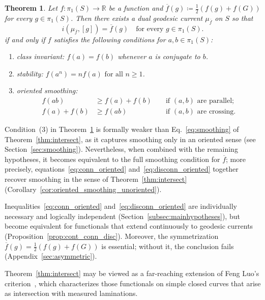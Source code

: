 \documentclass[11pt]{amsart}
\numberwithin{equation}{section}
\numberwithin{figure}{section}
\newtheorem{mainthmprime}{Theorem}
\theoremstyle{definition}
\theoremstyle{plain}
\begin{document}
\begin{mainthmprime}
Let $f \colon \pi_1(S) \to \mathbb{R}$ be a function and $\overline{f}(g) \coloneqq \frac{1}{2} \left(f(g) + f(G) \right)$ for every $g \in \pi_1(S)$.
Then there exists a dual geodesic current $\mu_{\overline{f}}$ on $S$ so that
\[
i(\mu_{\overline{f}}, [g]) = \overline{f}(g)
\quad\text{for every }g \in \pi_1(S).
\]
if and only if $f$ satisfies the following conditions for $a,b \in \pi_1(S)$:
\begin{enumerate}
\item class invariant: $f(a)=f(b)$ whenever $a$ is conjugate to $b$.
\item stability: 
$f(a^n)=nf(a) \mbox{ for all } n \geq 1$.
\item oriented smoothing:
 \begin{align}
    \label{eq:conn_oriented} f(ab) &\geq  f(a) + f(b) && \mbox{ if } (a,b)\mbox{ are } \mbox{parallel;} \\
    \label{eq:disconn_oriented} f(a) + f(b) &\geq f(ab)  && \mbox{ if }  (a,b)\mbox{ are } \mbox{crossing}.
  \end{align}
\end{enumerate}
\label{thm:intersections_group}
\end{mainthmprime}

Condition~(3) in Theorem~\ref{thm:intersections_group} is formally
weaker than Eq.~\eqref{eq:smoothing} of Theorem~\ref{thm:intersect}, as
it captures smoothing only in an oriented sense (see
Section~\ref{sec:smoothing}). Nevertheless, when combined with the
remaining hypotheses, it becomes equivalent to the full smoothing
condition for $\overline{f}$; more precisely, equations~\eqref{eq:conn_oriented}
and~\eqref{eq:disconn_oriented} together recover smoothing in the
sense of Theorem~\ref{thm:intersect}
(Corollary~\ref{cor:oriented_smoothing_unoriented}).

Inequalities~\eqref{eq:conn_oriented} and~\eqref{eq:disconn_oriented} are individually necessary and logically independent (Section~\ref{subsec:mainhypotheses}), but become equivalent for functionals that extend continuously to geodesic currents (Proposition~\ref{prop:cont_conn_disc}). Moreover,
the symmetrization $\overline f(g)=\tfrac12(f(g)+f(G))$ is
essential; without it, the conclusion fails
(Appendix~\ref{sec:asymmetric}).

Theorem~\ref{thm:intersect} may be viewed as a far-reaching extension
of Feng Luo’s criterion~\cite{Luo98:IntersectionNumbers}, which
characterizes those functionals on simple closed curves that arise as
intersection with measured laminations.
\end{document}
